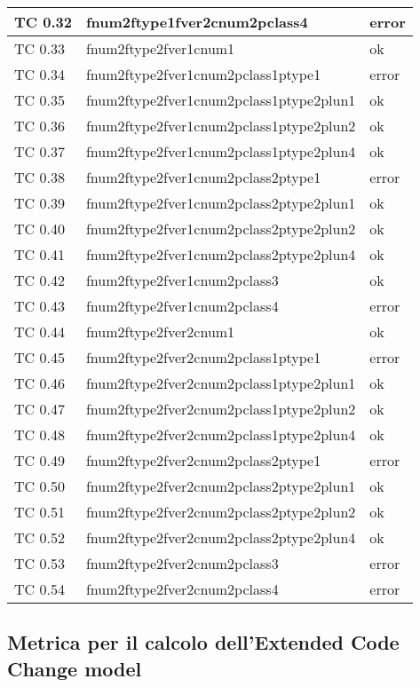 \begin{longtable}{|p{3cm}|p{7cm}|p{3cm}|}
	\hline
	TC 0.32			& fnum2ftype1fver2cnum2pclass4			& error \tabularnewline
	\hline
	TC 0.33			& fnum2ftype2fver1cnum1				& ok \tabularnewline
	\hline
	TC 0.34			& fnum2ftype2fver1cnum2pclass1ptype1		& error \tabularnewline
	\hline
	TC 0.35			& fnum2ftype2fver1cnum2pclass1ptype2plun1	& ok \tabularnewline
	\hline
	TC 0.36			& fnum2ftype2fver1cnum2pclass1ptype2plun2	& ok \tabularnewline
	\hline
	TC 0.37			& fnum2ftype2fver1cnum2pclass1ptype2plun4	& ok \tabularnewline
	\hline
	TC 0.38			& fnum2ftype2fver1cnum2pclass2ptype1		& error \tabularnewline
	\hline
	TC 0.39			& fnum2ftype2fver1cnum2pclass2ptype2plun1	& ok \tabularnewline
	\hline
	TC 0.40			& fnum2ftype2fver1cnum2pclass2ptype2plun2	& ok \tabularnewline
	\hline
	TC 0.41			& fnum2ftype2fver1cnum2pclass2ptype2plun4	& ok \tabularnewline
	\hline
	TC 0.42			& fnum2ftype2fver1cnum2pclass3			& ok \tabularnewline
	\hline
	TC 0.43			& fnum2ftype2fver1cnum2pclass4			& error \tabularnewline
	\hline
	TC 0.44			& fnum2ftype2fver2cnum1				& ok \tabularnewline
	\hline
	TC 0.45			& fnum2ftype2fver2cnum2pclass1ptype1		& error \tabularnewline
	\hline
	TC 0.46			& fnum2ftype2fver2cnum2pclass1ptype2plun1	& ok \tabularnewline
	\hline
	TC 0.47			& fnum2ftype2fver2cnum2pclass1ptype2plun2	& ok \tabularnewline
	\hline
	TC 0.48			& fnum2ftype2fver2cnum2pclass1ptype2plun4	& ok \tabularnewline
	\hline
	TC 0.49			& fnum2ftype2fver2cnum2pclass2ptype1		& error \tabularnewline
	\hline
	TC 0.50			& fnum2ftype2fver2cnum2pclass2ptype2plun1	& ok \tabularnewline
	\hline
	TC 0.51			& fnum2ftype2fver2cnum2pclass2ptype2plun2	& ok \tabularnewline
	\hline
	TC 0.52			& fnum2ftype2fver2cnum2pclass2ptype2plun4	& ok \tabularnewline
	\hline
	TC 0.53			& fnum2ftype2fver2cnum2pclass3			& error \tabularnewline
	\hline
	TC 0.54			& fnum2ftype2fver2cnum2pclass4			& error \tabularnewline
	\hline
\end{longtable}
\clearpage



\subsection{Metrica per il calcolo dell'Extended Code Change model}

